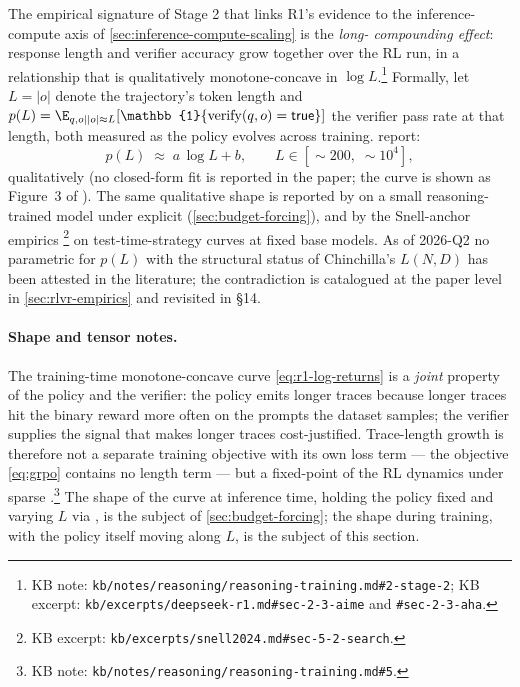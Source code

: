 The empirical signature of Stage 2 that links R1's evidence to the
inference-compute axis of \cref{sec:inference-compute-scaling} is the
\emph{long- compounding effect}: response length and verifier
accuracy grow together over the RL run, in a relationship that is
qualitatively monotone-concave in
$\log\!L$.\footnote{KB note:
\nolinkurl{kb/notes/reasoning/reasoning-training.md#2-stage-2}; KB
excerpt: \nolinkurl{kb/excerpts/deepseek-r1.md#sec-2-3-aime} and
\texttt{\#sec-2-3-aha}.} Formally, let $L = |o|$ denote the
trajectory's token length and $p(L) = \E_{q, o \mid |o| \approx L}
[\mathbb{1}\{\mathrm{verify}(q, o) = \mathsf{true}\}]$ the verifier
pass rate at that length, both measured as the policy evolves
across training. \citet[\S 2.3]{deepseek-r1} report:
\begin{equation}
  p(L) \;\approx\; a\,\log L + b,
  \qquad L \in [\sim\!200,\;\sim\!10^4],
  \label{eq:r1-log-returns}
\end{equation}
qualitatively (no closed-form fit is reported in the paper; the
curve is shown as Figure~3 of \citet{deepseek-r1}). The same
qualitative shape is reported by \citet{s1-2025} on a small
reasoning-trained model under explicit 
(\cref{sec:budget-forcing}), and by the Snell-anchor empirics
\citep[\S 5--6]{snell2024}\footnote{KB excerpt:
\nolinkurl{kb/excerpts/snell2024.md#sec-5-2-search}.} on
test-time-strategy curves at fixed base models. As of 2026-Q2 no
parametric  for $p(L)$ with the structural status of
Chinchilla's $L(N, D)$ has been attested in the literature; the
contradiction is catalogued at the paper level in
\cref{sec:rlvr-empirics} and revisited in §14.

\paragraph{Shape and tensor notes.} The training-time monotone-concave
curve \cref{eq:r1-log-returns} is a \emph{joint} property of the
policy and the verifier: the policy emits longer traces because longer
traces hit the binary reward more often on the prompts the dataset
samples; the verifier supplies the signal that makes longer traces
cost-justified. Trace-length growth is therefore not a separate
training objective with its own loss term --- the  objective
\cref{eq:grpo} contains no length term --- but a fixed-point of the
RL dynamics under sparse 
\citep[\S 2.2.2]{deepseek-r1}.\footnote{KB note:
\nolinkurl{kb/notes/reasoning/reasoning-training.md#5}.} The shape of
the curve at inference time, holding the policy fixed and varying
$L$ via , is the subject of \cref{sec:budget-forcing};
the shape during training, with the policy itself moving along $L$,
is the subject of this section.

